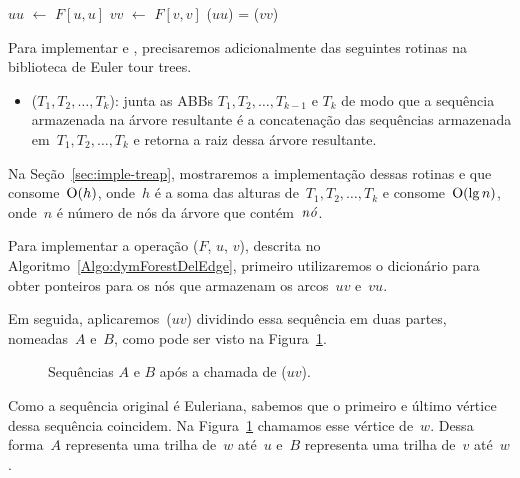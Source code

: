 \begin{algorithm}[htb]
\caption{\dymForestQuery($F$, $u$, $v$)}
\label{Algo:dymForestQuery}
\begin{algorithmic}[1]
\State $uu$ $\gets$ $F[u,u]$
\State $vv$ $\gets$ $F[v,v]$
\State \Return \treapGetRoot($uu$) = \treapGetRoot($vv$)
\end{algorithmic}
\end{algorithm}

Para implementar \dymForestAddEdge{} e \dymForestDelEdge{}, precisaremos adicionalmente das seguintes rotinas na biblioteca de Euler tour trees. 
\begin{itemize}
\item \treapJoin($T_1, T_2, \ldots, T_k$): junta as ABBs $T_1, T_2, \ldots, T_{k-1}$ e $T_k$ de modo que a sequência armazenada na árvore resultante é a concatenação das sequências armazenada em~$T_1, T_2, \ldots, T_k$ e retorna a raiz dessa árvore resultante.
\end{itemize}

Na Seção~\ref{sec:imple-treap}, mostraremos a implementação dessas rotinas e que~\treapJoin{} consome~$\mathrm{O}(h)$, onde~$h$ é a soma das alturas de~$T_1, T_2, \ldots, T_k$ e \treapSplit{} consome~$\mathrm{O}(\lg n)$, onde~$n$ é número de nós da árvore que contém~$\mathit{n\acute{o}}$.

Para implementar a operação \dymForestDelEdge($F$, $u$, $v$), descrita no Algoritmo~\ref{Algo:dymForestDelEdge}, 
primeiro utilizaremos o dicionário para obter ponteiros para os nós que armazenam os arcos~$uv$ e~$vu$.

Em seguida, aplicaremos~\treapSplit($uv$) dividindo essa sequência em duas partes, nomeadas~$A$ e~$B$, como pode ser visto na Figura~\ref{fig:algorit-cut-seqxy}.
\begin{figure}[htb]
\centering

\caption{Sequências $A$ e $B$ após a chamada de \treapSplit($uv$).}
\label{fig:algorit-cut-seqxy}
\end{figure}

Como a sequência original é Euleriana, sabemos que o primeiro e último vértice dessa sequência coincidem. Na Figura~\ref{fig:algorit-cut-seqxy} chamamos esse vértice de~$w$.
Dessa forma~$A$ representa uma trilha de~$w$ até~$u$ e~$B$ representa uma trilha de~$v$ até~$w$.


